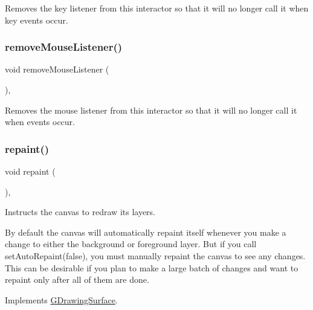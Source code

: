 Removes the key listener from this interactor so that it will no longer call it when key events occur. 

\mbox{\label{classsgl_1_1GInteractor_aff47f71ce47e688a07c9d38dc92fcc11}} 
\subsubsection{\texorpdfstring{remove\+Mouse\+Listener()}{removeMouseListener()}}
{\footnotesize\ttfamily void remove\+Mouse\+Listener (\begin{DoxyParamCaption}{ }\end{DoxyParamCaption})\hspace{0.3cm}{\ttfamily [virtual]}, {\ttfamily [inherited]}}



Removes the mouse listener from this interactor so that it will no longer call it when events occur. 

\mbox{\label{classsgl_1_1GCanvas_afb8dbc55702230f0030e47d6c009697f}} 
\subsubsection{\texorpdfstring{repaint()}{repaint()}}
{\footnotesize\ttfamily void repaint (\begin{DoxyParamCaption}{ }\end{DoxyParamCaption})\hspace{0.3cm}{\ttfamily [override]}, {\ttfamily [virtual]}}



Instructs the canvas to redraw its layers. 

By default the canvas will automatically repaint itself whenever you make a change to either the background or foreground layer. But if you call set\+Auto\+Repaint(false), you must manually repaint the canvas to see any changes. This can be desirable if you plan to make a large batch of changes and want to repaint only after all of them are done. 

Implements \mbox{\hyperlink{classsgl_1_1GDrawingSurface_a4a8ae47b42f1e6a41b65d3546df46218}{G\+Drawing\+Surface}}.


